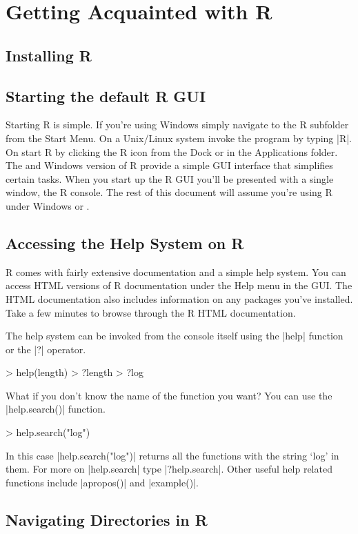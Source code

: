 \section{Getting Acquainted with R}

\subsection{Installing R}


\subsection{Starting the default R GUI}

Starting R is simple. If you're using Windows simply navigate to the R
subfolder from the Start Menu. On a Unix/Linux system invoke the program by
typing |R|. On \OSX start R by clicking the R icon from the Dock or in the
Applications folder. The \OSX and Windows version of R provide a simple GUI
interface that simplifies certain tasks. When you start up the R GUI you'll be
presented with a single window, the R console. The rest of this document will
assume you're using R under Windows or \OSX.


\subsection{Accessing the Help System on R}

R comes with fairly extensive documentation and a simple help system. You can
access HTML versions of R documentation under the Help menu in the GUI. The
HTML documentation also includes information on any packages you've installed.
Take a few minutes to browse through the R HTML documentation.

The help system can be invoked from the console itself using the
|help| function or the |?| operator.
%
\begin{R}
> help(length)
> ?length
> ?log
\end{R}
%
What if you don't know the name of the function you want? You can use
the |help.search()| function.
%
\begin{R}
> help.search("log")
\end{R}
%
In this case |help.search("log")| returns all the functions with
the string `log' in them. For more on |help.search| type
|?help.search|. Other useful help related functions include
|apropos()| and |example()|.

\subsection{Navigating Directories in R}


